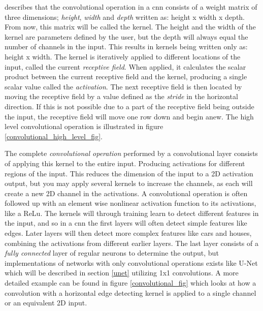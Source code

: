     
     \citeauthor{o2015introduction_convolutions}\cite{o2015introduction_convolutions} describes that the convolutional operation in a \gls{cnn} consists of a weight matrix of three dimensions; \textit{height}, \textit{width} and \textit{depth} written as: height x width x depth. From now, this matrix will be called the kernel. The height and the width of the kernel are parameters defined by the user, but the depth will always equal the number of channels in the input. This results in kernels being written only as: height x width.  The kernel is iteratively applied to different locations of the input, called the current \textit{receptive field}. When applied, it calculates the scalar product between the current receptive field and the kernel, producing a single scalar value called the \textit{activation}. The next receptive field is then located by moving the receptive field by a value defined as the \textit{stride} in the horizontal direction. If this is not possible due to a part of the  receptive field being outside the input, the receptive field will move one row down and begin anew. The high level convolutional operation is illustrated in figure \ref{convolutional_high_level_fig}.

    The complete \textit{convolutional operation} performed by a convolutional layer consists of applying this kernel to the entire input. Producing activations for different regions of the input. This reduces the dimension of the input to a 2D activation output, but you may apply several kernels to increase the channels, as each will create a new 2D channel in the activations. A convolutional operation is often followed up with an element wise nonlinear activation function to its activations, like a ReLu. The kernels will through training learn to detect different features in the input, and so in a \gls{cnn} the first layers will often detect simple features like edges. Later layers will then detect more complex features like cars and houses, combining the activations from different earlier layers. The last layer consists of a \textit{fully connected} layer of regular neurons to determine the output, but implementations of networks with only convolutional operations exists like U-Net which will be described\cite{unet_ronneberger2015} in section \ref{unet} utilizing 1x1 convolutions. A more detailed example can be found in figure \ref{convolutional_fig} which looks at how a convolution with a horizontal edge detecting kernel is applied to a single channel or an equivalent 2D input. 
    
